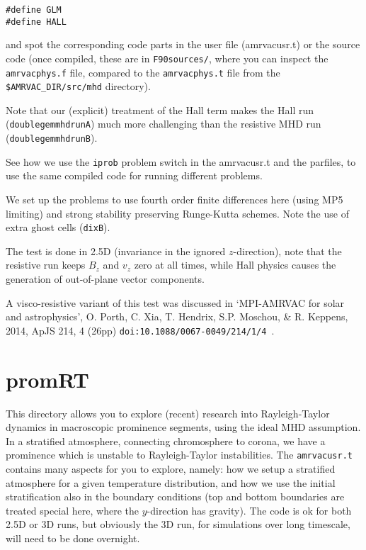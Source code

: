 \documentclass[10pt]{article}
\begin{document}
\begin{verbatim}
#define GLM
#define HALL
\end{verbatim}

and spot the corresponding code parts in the user file (amrvacusr.t) or the source code (once compiled, these are in {\tt F90sources/}, where you can inspect the {\tt amrvacphys.f} file, compared to the {\tt amrvacphys.t} file from the {\tt \$AMRVAC\_DIR/src/mhd} directory).


Note that our (explicit) treatment of the Hall term makes the Hall run ({\tt doublegemmhdrunA}) much more challenging than the resistive MHD run ({\tt doublegemmhdrunB}). 

See how we use the {\tt iprob} problem switch in the amrvacusr.t and the parfiles, to use the same compiled code for running different problems.

We set up the problems to use fourth order finite differences here (using MP5 limiting) and strong stability preserving Runge-Kutta schemes. Note the use of extra ghost cells ({\tt dixB}).

The test is done in 2.5D (invariance in the ignored $z$-direction), note that the resistive run keeps $B_z$ and $v_z$ zero at all times, while Hall physics causes the generation of out-of-plane vector components.

A visco-resistive variant of this test was discussed in `MPI-AMRVAC for solar and astrophysics', O. Porth, C. Xia, T. Hendrix, S.P. Moschou, \& R. Keppens, 2014, ApJS 214, 4 (26pp) {\tt doi:10.1088/0067-0049/214/1/4 }.

\section*{promRT}

This directory allows you to explore (recent) research into Rayleigh-Taylor dynamics in macroscopic prominence segments, using the ideal MHD assumption. In a stratified atmosphere, connecting chromosphere to corona, we have a prominence which is unstable to Rayleigh-Taylor instabilities. The {\tt amrvacusr.t} contains many aspects for you to explore, namely: how we setup a stratified atmosphere for a given temperature distribution, and how we use the initial stratification also in the boundary conditions (top and bottom boundaries are treated special here, where the $y$-direction has gravity). The code is ok for both 2.5D or 3D runs,
but obviously the 3D run, for simulations over long timescale, will need to be done overnight.
\end{document}
